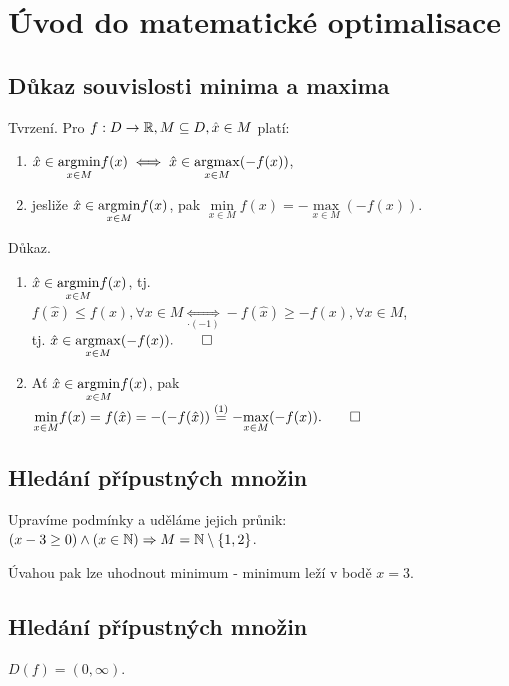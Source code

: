 \section{Úvod do matematické optimalisace}

\subsection{Důkaz souvislosti minima a maxima}
Tvrzení. Pro $f: D \rightarrow \mathbb{R}, M \subseteq D, \hat{x} \in M$ platí:

\begin{enumerate}[(1)]
    \item $\hat{x} \in \underset{x \in M}{\operatorname*{argmin}} f(x) \iff \hat{x} \in \underset{x \in M}{\operatorname*{argmax}} (-f(x))$,
    \item jesliže $\hat{x} \in \underset{x \in M}{\operatorname*{argmin}} f(x)$, pak $\underset{x \in M}{\min} f(x) =
    - \underset{x \in M}{\max} (-f(x))$.
\end{enumerate}
Důkaz.
\begin{enumerate}[(1)]
    \item $\hat{x} \in \underset{x \in M}{\operatorname*{argmin}} f(x)$, tj. $f(\hat{x}) \leq f(x), 
    \forall x \in M \underset{\cdot (-1)}{\iff}
    -f(\hat{x}) \geq -f(x), \forall x \in M$,\\tj. $\hat{x} \in \underset{x \in M}{\operatorname*{argmax}} (-f(x)). \qed$

    \item Ať $\hat{x} \in \underset{x \in M}{\operatorname*{argmin}} f(x)$, pak $\underset{x \in M}{\min} f(x) = f(\hat{x}) =
    - (- f(\hat{x})) \overset{(1)}{=} - \underset{x \in M}{\max} (-f(x)). \qed$
\end{enumerate}

\subsection{Hledání přípustných množin}
Upravíme podmínky a uděláme jejich průnik: $(x - 3 \geq 0) \land (x \in \mathbb{N}) \Rightarrow M = \mathbb{N} \setminus \left\lbrace 1,2 \right\rbrace$.

Úvahou pak lze uhodnout minimum - minimum leží v bodě $x=3$.

\subsection{Hledání přípustných množin}
$D(f) = (0, \infty)$.

